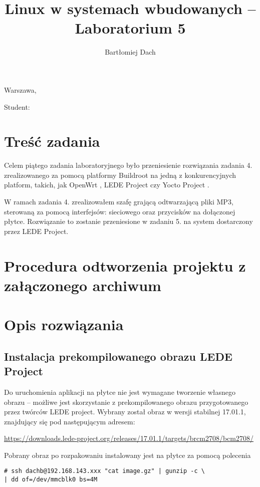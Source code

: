 \documentclass[10pt,a4paper]{article}
\title{Linux w systemach wbudowanych -- Laboratorium 5}
\author{Bartłomiej Dach}
\begin{document}
\makeatletter
\begin{flushright}
	Warszawa, \@date
\end{flushright}
\begin{center}
	\LARGE{\@title}
\end{center}
\vspace{0.25cm}
Student: \@author
\makeatother

\section{Treść zadania}

Celem piątego zadania laboratoryjnego było przeniesienie rozwiązania zadania 4. zrealizowanego
za pomocą platformy Buildroot na jedną z konkurencyjnych platform, takich, jak OpenWrt
\cite{openwrt}, LEDE Project \cite{lede} czy Yocto Project \cite{yocto}.

W ramach zadania 4. zrealizowałem szafę grającą odtwarzającą pliki MP3, sterowaną za pomocą
interfejsów: sieciowego oraz przycisków na dołączonej płytce. Rozwiązanie to zostanie przeniesione
w zadaniu 5. na system dostarczony przez LEDE Project.

\section{Procedura odtworzenia projektu z załączonego archiwum}


\section{Opis rozwiązania}

\subsection{Instalacja prekompilowanego obrazu LEDE Project}

Do uruchomienia aplikacji na płytce nie jest wymagane tworzenie własnego obrazu -- możliwe jest
skorzystanie z prekompilowanego obrazu przygotowanego przez twórców LEDE project. Wybrany został
obraz w wersji stabilnej 17.01.1, znajdujący się pod następującym adresem:

\url{https://downloads.lede-project.org/releases/17.01.1/targets/brcm2708/bcm2708/}

Pobrany obraz po rozpakowaniu instalowany jest na płytce za pomocą polecenia

\begin{lstlisting}
# ssh dachb@192.168.143.xxx "cat image.gz" | gunzip -c \
| dd of=/dev/mmcblk0 bs=4M
\end{lstlisting}
\end{document}
